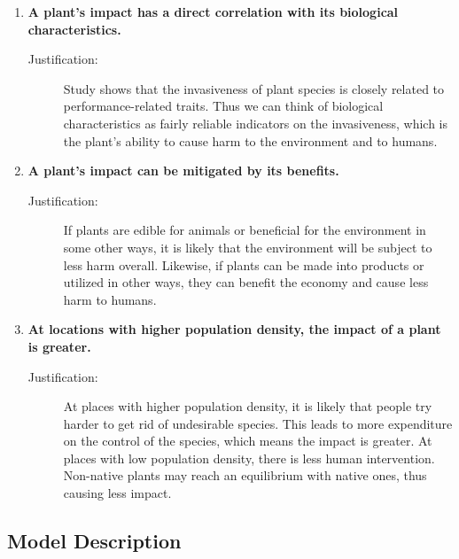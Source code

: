 \documentclass[12pt]{article}
\begin{document}
		\begin{enumerate}
			
			\item \textbf{A plant's impact has a direct correlation with its biological characteristics.}
			\vspace{-0.125in}
			\begin{description}
				\item[Justification:] Study shows that the invasiveness of plant species is closely related to \\performance-related traits\autocite{van2010meta}.  Thus we can think of biological characteristics as fairly reliable indicators on the invasiveness, which is the plant's ability to cause harm to the environment and to humans.  
			\end{description}
			
			\item \label{assumption:offset} \textbf{A plant's impact can be mitigated by its benefits.}
			\vspace{-0.125in}
			\begin{description}
				\item[Justification:] If plants are edible for animals or beneficial for the environment in some other ways, it is likely that the environment will be subject to less harm overall.  Likewise, if plants can be made into products or utilized in other ways, they can benefit the economy and cause less harm to humans.  
			\end{description}
			
			\item \textbf{At locations with higher population density, the impact of a plant is greater.}
			\vspace{-0.125in}
			\begin{description}
				\item[Justification:] At places with higher population density, it is likely that people try harder to get rid of undesirable species.  This leads to more expenditure on the control of the species, which means the impact is greater.  At places with low population density, there is less human intervention. Non-native plants may reach an equilibrium with native ones, thus causing less impact.  
			\end{description}
			
		\end{enumerate}
	
	\subsection{Model Description}
	
\end{document}
